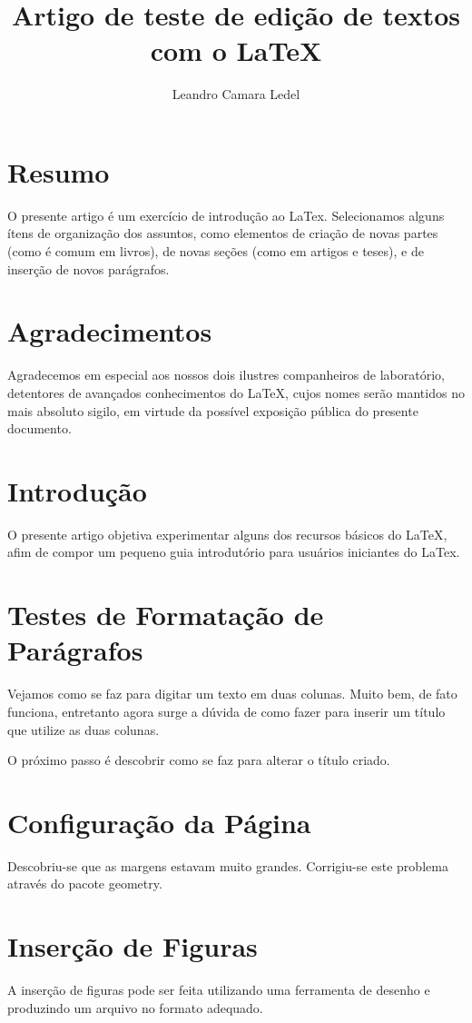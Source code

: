 \documentclass[11pt,a4paper,twocolumn]{article}
\author{Leandro Camara Ledel}
\title{Artigo de teste de edição de textos com o LaTeX}
\begin{document}
\maketitle

\section*{Resumo}
O presente artigo é um exercício de introdução ao LaTex. Selecionamos alguns ítens de organização dos assuntos, como elementos de criação de novas partes (como é comum em livros), de novas seções (como em artigos e teses), e de inserção de novos parágrafos.

\section*{Agradecimentos}
Agradecemos em especial aos nossos dois ilustres companheiros de laboratório, detentores de avançados conhecimentos do LaTeX, cujos nomes serão mantidos no mais absoluto sigilo, em virtude da possível exposição pública do presente documento.

\section{Introdução}
O presente artigo objetiva experimentar alguns dos recursos básicos do LaTeX, afim de compor um pequeno guia introdutório para usuários iniciantes do LaTex.

\section{Testes de Formatação de Parágrafos}
Vejamos como se faz para digitar um texto em duas colunas. Muito bem, de fato funciona, entretanto agora surge a dúvida de como fazer para inserir um título que utilize as duas colunas.

O próximo passo é descobrir como se faz para alterar o título criado.

\section{Configuração da Página}
Descobriu-se que as margens estavam muito grandes. Corrigiu-se este problema através do pacote geometry.

\section{Inserção de Figuras}
A inserção de figuras pode ser feita utilizando uma ferramenta de desenho e produzindo um arquivo no formato adequado.
\end{document}
